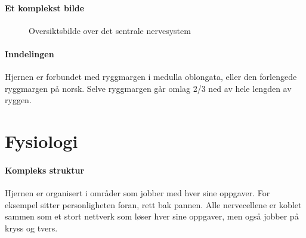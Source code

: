 			\paragraph{Et komplekst bilde}
				\begin{figure}[ht]
                      \centering
                      \caption{Oversiktsbilde over det sentrale nervesystem}
                    \end{figure}
			\paragraph{Inndelingen\\}
				Hjernen er forbundet med ryggmargen i medulla oblongata, eller den forlengede ryggmargen på norsk. Selve ryggmargen går omlag 2/3 ned av hele lengden av ryggen. 
		\section{Fysiologi}
			\paragraph{Kompleks struktur\\}
				Hjernen er organisert i områder som jobber med hver sine oppgaver. For eksempel sitter personligheten foran, rett bak pannen. Alle nervecellene er koblet sammen som et stort nettverk som løser hver sine oppgaver, men også jobber på kryss og tvers. 
